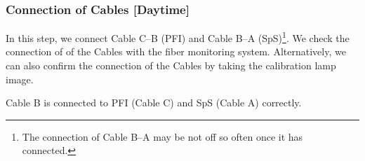 \subsubsection{Connection of Cables [Daytime]}\label{secflow:FibConcec}

In this step,  we connect Cable C--B (PFI) and Cable B--A (SpS)\footnote{The connection of Cable B--A may be not off so often once it has connected.}.
We check the connection of of the Cables with the fiber monitoring system.
Alternatively, we can also confirm the connection of the Cables by taking the calibration lamp image.

\begin{itembox}[l]{}
Cable B is connected to PFI (Cable C) and SpS (Cable A) correctly.
\end{itembox}